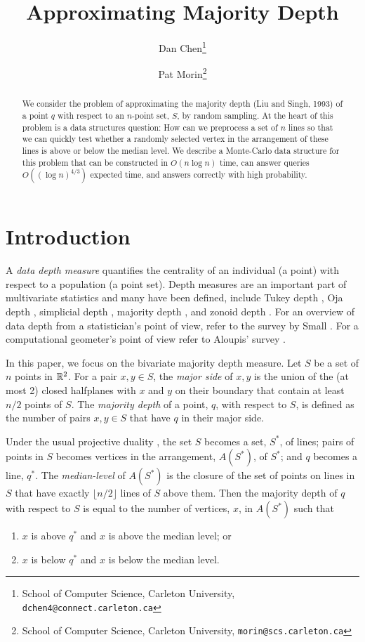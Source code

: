 \documentclass{cccg12}
\title{Approximating Majority Depth}
\author{Dan Chen\thanks{School of Computer Science,
  Carleton University, {\tt dchen4@connect.carleton.ca}}
  \and Pat Morin\thanks{School of Computer Science,
  Carleton University, {\tt morin@scs.carleton.ca}}}
\begin{document}
\thispagestyle{empty}
\maketitle

\begin{abstract}
We consider the problem of approximating the majority depth (Liu and
Singh, 1993) of a point $q$ with respect to an $n$-point set, $S$,
by random sampling.  At the heart of this problem is a data structures
question: How can we preprocess a set of $n$ lines so that we can quickly
test whether a randomly selected vertex in the arrangement of these
lines is above or below the median level.  We describe a Monte-Carlo data
structure for this problem that can be constructed in $O(n\log n)$ time,
can answer queries $O((\log n)^{4/3})$ expected time, and answers correctly
with high probability.
\end{abstract}

\section{Introduction}

A \emph{data depth measure} quantifies the centrality
of an individual (a point) with respect to a population (a point set).
Depth measures are an important part of multivariate statistics and many
have been defined, include Tukey depth \cite{t74}, Oja
depth \cite{o83}, simplicial depth \cite{l90}, majority depth \cite{ls93},
and zonoid depth \cite{dkm96}.  For an overview of data depth from a
statistician's point of view, refer to the survey by Small \cite{s90}.
For a computational geometer's point of view refer to Aloupis' survey
\cite{a06}.

In this paper, we focus on the bivariate majority depth measure.
Let $S$ be a set of $n$ points in $\mathbb{R}^2$.  For a pair $x,y\in S$,
the \emph{major side} of $x,y$ is the union of the (at most 2) closed
halfplanes with $x$ and $y$ on their boundary that contain at least $n/2$
points of $S$.  The \emph{majority depth} \cite{ls93,s91} of a point,
$q$, with respect to $S$, is defined as the number of pairs $x,y\in S$
that have $q$ in their major side.

Under the usual projective duality \cite{e97}, the set $S$ becomes
a set, $S^*$, of lines; pairs of points in $S$ becomes vertices
in the arrangement, $A(S^*)$, of $S^*$; and $q$ becomes a line, $q^*$.
The \emph{median-level} of $A(S^*)$ is the closure of the set of points
on lines in $S$ that have exactly $\lfloor n/2\rfloor$ lines of $S$
above them.  Then the majority depth of $q$ with respect to $S$ is equal
to the number of vertices, $x$, in $A(S^*)$ such that
\begin{enumerate}
\item $x$ is above $q^*$ and $x$ is above the median level; or
\item $x$ is below $q^*$ and $x$ is below the median level.
\end{enumerate}
\end{document}
